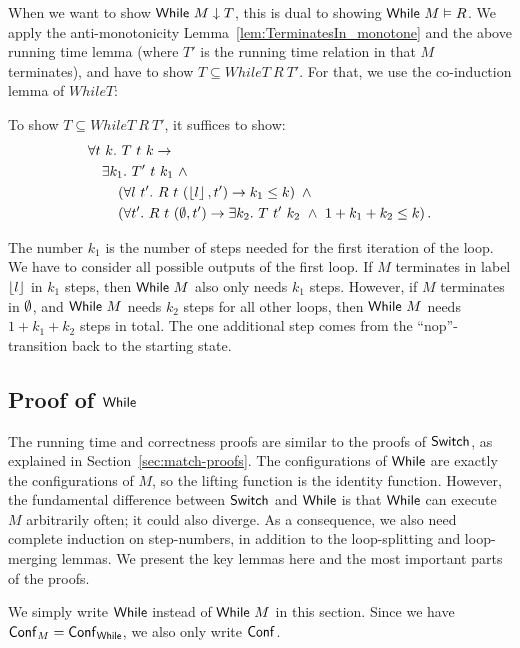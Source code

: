 When we want to show $\mathsf{While}~M \mathrel{\downarrow} T$, this is dual to showing $\mathsf{While}~M \mathrel{\vDash} R$.  We apply the anti-monotonicity
Lemma~\ref{lem:TerminatesIn_monotone} and the above running time lemma (where $T'$ is the running time relation in that $M$ terminates), and have to
show $T \subseteq WhileT~R~T'$.  For that, we use the co-induction lemma of $WhileT$:
\begin{lemma}
  \label{lem:WhileCoInduction}
  To show $T \subseteq WhileT~R~T'$, it suffices to show:
  \begin{alignat*}{1}
    &\forall t~k.~T~t~k \rightarrow \\
    &\quad \exists k_1.~T'~t~k_1 ~\land~ \\
    &\quad\quad \left( \forall l~t'.~R~t~(\left\lfloor {l} \right\rfloor, t') \rightarrow k_1 \leq k \right) ~\land~ \\
    &\quad\quad \left( \forall t'.~R~t~(\emptyset, t') \rightarrow \exists k_2.~T~t'~k_2 ~\land~ 1+k_1+k_2 \leq k \right).
  \end{alignat*}
\end{lemma}
The number $k_1$ is the number of steps needed for the first iteration of the loop.  We have to consider all possible outputs of the first loop.  If
$M$ terminates in label $\left\lfloor {l} \right\rfloor$ in $k_1$ steps, then $\mathsf{While}~M$ also only needs $k_1$ steps.  However, if $M$ terminates in $\emptyset$, and $\mathsf{While}~M$
needs $k_2$ steps for all other loops, then $\mathsf{While}~M$ needs $1+k_1+k_2$ steps in total.  The one additional step comes from the ``nop''-transition
back to the starting state.



\subsection{Proof of $\mathsf{While}$}
\label{sec:while-proofs}

The running time and correctness proofs are similar to the proofs of $\mathsf{Switch}$, as explained in Section~\ref{sec:match-proofs}.  The configurations of
$\mathsf{While}$ are exactly the configurations of $M$, so the lifting function is the identity function.  However, the fundamental difference between
$\mathsf{Switch}$ and $\mathsf{While}$ is that $\mathsf{While}$ can execute $M$ arbitrarily often; it could also diverge.  As a consequence, we also need complete induction
on step-numbers, in addition to the loop-splitting and loop-merging lemmas.  We present the key lemmas here and the most important parts of the
proofs.

We simply write $\mathsf{While}$ instead of $\mathsf{While}~M$ in this section.  Since we have $\mathsf{Conf}_M = \mathsf{Conf}_{\mathsf{While}}$, we also only write $\mathsf{Conf}$.

